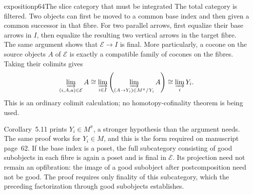 \begin{dcomment}{exposition}{p64}{The slice category that must be integrated}
The total category is filtered. Two objects can first be moved to a common base index and then given a common successor in that fibre. For two parallel arrows, first equalize their base arrows in $I$, then equalize the resulting two vertical arrows in the target fibre. The same argument shows that $\mathcal E\to I$ is final. More particularly, a cocone on the source objects $A$ of $\mathcal E$ is exactly a compatible family of cocones on the fibres. Taking their colimits gives
\[
 \varinjlim_{(i,A,a)\in\mathcal E}A
 \cong \varinjlim_{i\in I}
          \left(\varinjlim_{(A\to Y_i)\in M^\pi/Y_i}A\right)
 \cong \varinjlim_iY_i.
\]
This is an ordinary colimit calculation; no homotopy-cofinality theorem is being used.

Corollary~5.11 prints $Y_i\in M^\pi$, a stronger hypothesis than the argument needs. The same proof works for $Y_i\in M$, and this is the form required on manuscript page~62. If the base index is a poset, the full subcategory consisting of good subobjects in each fibre is again a poset and is final in $\mathcal E$. Its projection need not remain an opfibration: the image of a good subobject after postcomposition need not be good. The proof requires only finality of this subcategory, which the preceding factorization through good subobjects establishes.
\end{dcomment}

